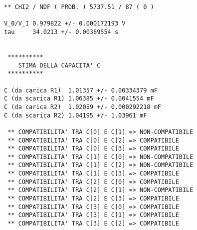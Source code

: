 \begin{verbatim}
** CHI2 / NDF ( PROB. ) 5737.51 / 87 ( 0 )

V_0/V_I 0.979822 +/- 0.000172193 V
tau     34.0213 +/- 0.00389554 s


 **********
    STIMA DELLA CAPACITA' C 
 **********

C (da carica R1)  1.01357 +/- 0.00334379 mF
C (da scarica R1) 1.06385 +/- 0.0041554 mF
C (da carica R2)  1.02059 +/- 0.000292218 mF
C (da scarica R2) 1.04195 +/- 1.03961 mF

 ** COMPATIBILITA' TRA C[0] E C[1] => NON-COMPATIBILE
 ** COMPATIBILITA' TRA C[0] E C[2] => COMPATIBILE
 ** COMPATIBILITA' TRA C[0] E C[3] => COMPATIBILE
 ** COMPATIBILITA' TRA C[1] E C[0] => NON-COMPATIBILE
 ** COMPATIBILITA' TRA C[1] E C[2] => NON-COMPATIBILE
 ** COMPATIBILITA' TRA C[1] E C[3] => COMPATIBILE
 ** COMPATIBILITA' TRA C[2] E C[0] => COMPATIBILE
 ** COMPATIBILITA' TRA C[2] E C[1] => NON-COMPATIBILE
 ** COMPATIBILITA' TRA C[2] E C[3] => COMPATIBILE
 ** COMPATIBILITA' TRA C[3] E C[0] => COMPATIBILE
 ** COMPATIBILITA' TRA C[3] E C[1] => COMPATIBILE
 ** COMPATIBILITA' TRA C[3] E C[2] => COMPATIBILE

\end{verbatim}
